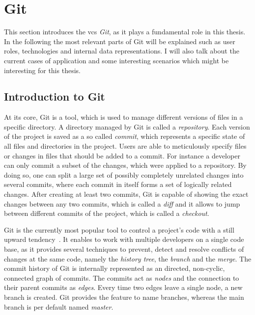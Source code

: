 \section{Git}\label{git-explanation}
This section introduces the \ac{vcs} \emph{Git}, as it plays a fundamental role in this thesis.
In the following the most relevant parts of Git will be explained such as user roles, technologies and internal data representations.
I will also talk about the current cases of application and some interesting scenarios which might be interesting for this thesis.


\subsection{Introduction to Git}\label{git-introduction}
At its core, Git is a tool, which is used to manage different versions of files in a specific directory. A directory managed by Git is called a \emph{repository}.
Each version of the project is saved as a so called \emph{commit}, which represents a specific state of all files and directories in the project.
Users are able to meticulously specify files or changes in files that should be added to a commit.
For instance a developer can only commit a subset of the changes, which were applied to a repository.
By doing so, one can split a large set of possibly completely unrelated changes into several commits, where each commit in itself forms a set of logically related changes.
After creating at least two commits, Git is capable of showing the exact changes between any two commits, which is called a \emph{diff} and it allows to jump between different commits of the project, which is called a \emph{checkout}.

Git is the currently most popular tool to control a project's code with a still upward tendency~\cite{article:git-popularity}.
It enables to work with multiple developers on a single code base, as it provides several techniques to prevent, detect and resolve conflicts of changes at the same code, namely the \emph{history tree}, the \emph{branch} and the \emph{merge}.
The commit history of Git is internally represented as an directed, non-cyclic, connected graph of commits.
The commits act as \emph{nodes} and the connection to their parent commits as \emph{edges}.
Every time two edges leave a single node, a new branch is created.
Git provides the feature to name branches, whereas the main branch is per default named \emph{master}.

